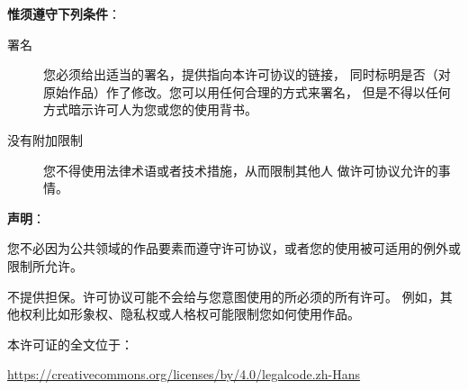 \documentclass[UTF8,fontset=none,linespread=1.15]{ctexart}
\begin{document}
\vspace{2ex}
\noindent\textbf{\large 惟须遵守下列条件}：
\begin{description}
\item[署名] 您必须给出适当的署名，提供指向本许可协议的链接，
同时标明是否（对原始作品）作了修改。您可以用任何合理的方式来署名，
但是不得以任何方式暗示许可人为您或您的使用背书。
\item[没有附加限制] 您不得使用法律术语或者技术措施，从而限制其他人
做许可协议允许的事情。
\end{description}

\vspace{2ex}
\noindent\textbf{\large 声明}：

您不必因为公共领域的作品要素而遵守许可协议，或者您的使用被可适用的例外或限制所允许。

不提供担保。许可协议可能不会给与您意图使用的所必须的所有许可。
例如，其他权利比如形象权、隐私权或人格权可能限制您如何使用作品。

本许可证的全文位于：\\
\centerline{\url{https://creativecommons.org/licenses/by/4.0/legalcode.zh-Hans}}


\end{document}
